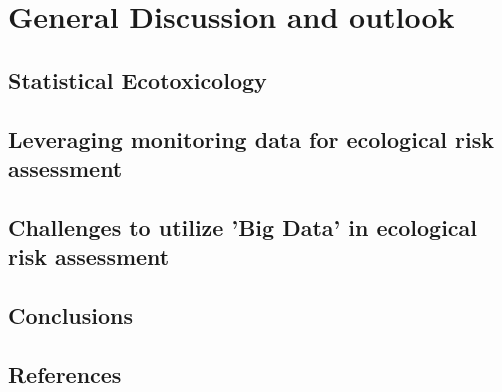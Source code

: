 \chapter{General Discussion and outlook}
\label{sec:discussion} 
 
\section{Statistical Ecotoxicology}




\section{Leveraging monitoring data for ecological risk assessment}



\section{Challenges to utilize 'Big Data' in ecological risk assessment}




\section{Conclusions}






\section{References}
\printbibliography[heading=none]
